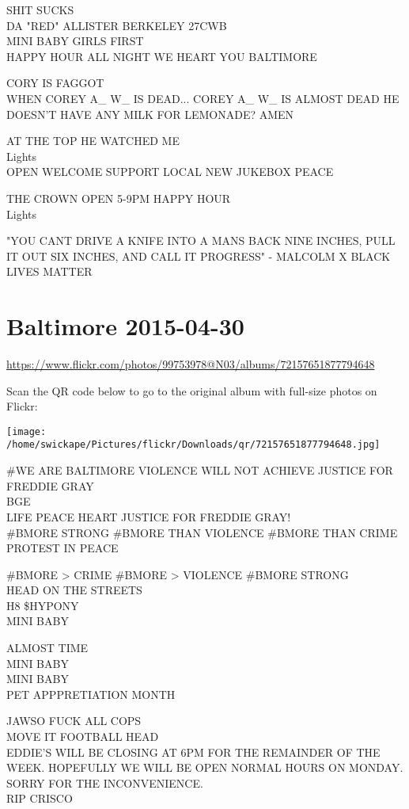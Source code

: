 \documentclass[10pt,letterpaper]{article}
\begin{document}
SHIT SUCKS\\
DA "RED" ALLISTER BERKELEY 27CWB\\
MINI BABY GIRLS FIRST\\
HAPPY HOUR ALL NIGHT WE HEART YOU BALTIMORE

CORY IS FAGGOT\\
WHEN COREY A\_ W\_ IS DEAD...  COREY A\_ W\_ IS ALMOST DEAD HE DOESN'T HAVE ANY MILK FOR LEMONADE?  AMEN

AT THE TOP HE WATCHED ME\\
Lights\\
OPEN WELCOME SUPPORT LOCAL NEW JUKEBOX PEACE

THE CROWN OPEN 5{-}9PM HAPPY HOUR\\
Lights

"YOU CANT DRIVE A KNIFE INTO A MANS BACK NINE INCHES, PULL IT OUT SIX INCHES, AND CALL IT PROGRESS" {-} MALCOLM X BLACK LIVES MATTER
\pagebreak

\section*{Baltimore 2015-04-30}

\url{https://www.flickr.com/photos/99753978@N03/albums/72157651877794648}

Scan the QR code below to go to the original album with full-size photos on Flickr:

\texttt{[image: /home/swickape/Pictures/flickr/Downloads/qr/72157651877794648.jpg]}
\pagebreak

\#WE ARE BALTIMORE VIOLENCE WILL NOT ACHIEVE JUSTICE FOR FREDDIE GRAY\\
BGE\\
LIFE PEACE HEART JUSTICE FOR FREDDIE GRAY!\\
\#BMORE STRONG \#BMORE THAN VIOLENCE \#BMORE THAN CRIME PROTEST IN PEACE

\#BMORE > CRIME \#BMORE > VIOLENCE \#BMORE STRONG\\
HEAD ON THE STREETS\\
H8 \$HYPONY\\
MINI BABY

ALMOST TIME\\
MINI BABY\\
MINI BABY\\
PET APPPRETIATION MONTH

JAWSO FUCK ALL COPS\\
MOVE IT FOOTBALL HEAD\\
EDDIE'S WILL BE CLOSING AT 6PM FOR THE REMAINDER OF THE WEEK.  HOPEFULLY WE WILL BE OPEN NORMAL HOURS ON MONDAY.  SORRY FOR THE INCONVENIENCE.\\
RIP CRISCO
\end{document}
